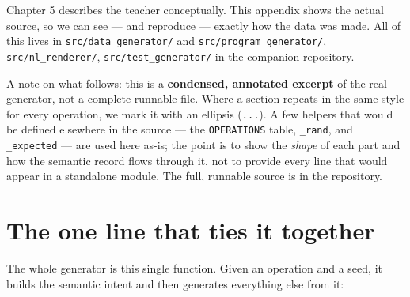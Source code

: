 Chapter 5 describes the teacher conceptually. This appendix shows the
actual source, so we can see --- and reproduce --- exactly how the data
was made. All of this lives in \texttt{src/data\_generator/} and
\texttt{src/program\_generator/}, \texttt{src/nl\_renderer/},
\texttt{src/test\_generator/} in the companion repository.

A note on what follows: this is a \textbf{condensed, annotated excerpt}
of the real generator, not a complete runnable file. Where a section
repeats in the same style for every operation, we mark it with an
ellipsis (\texttt{...}). A few helpers that would be defined elsewhere
in the source --- the \texttt{OPERATIONS} table, \texttt{\_rand}, and
\texttt{\_expected} --- are used here as-is; the point is to show the
\emph{shape} of each part and how the semantic record flows through it,
not to provide every line that would appear in a standalone module. The
full, runnable source is in the repository.

\section{The one line that ties it
together}\label{the-one-line-that-ties-it-together}

The whole generator is this single function. Given an operation and a
seed, it builds the semantic intent and then generates everything else
from it:

